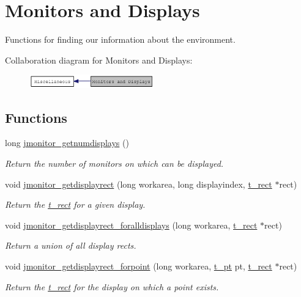 \hypertarget{group__jmonitor}{
\section{Monitors and Displays}
\label{group__jmonitor}
}


Functions for finding our information about the environment.  


Collaboration diagram for Monitors and Displays:\nopagebreak
\begin{figure}[H]
\begin{center}
\leavevmode
\includegraphics[width=153pt]{group__jmonitor}
\end{center}
\end{figure}
\subsection*{Functions}
\begin{DoxyCompactItemize}
\item 
long \hyperlink{group__jmonitor_ga2bd6c2e27e9ac7bfdd05cbf815ef1082}{jmonitor\_\-getnumdisplays} ()
\begin{DoxyCompactList}\small\item\em Return the number of monitors on which can be displayed. \item\end{DoxyCompactList}\item 
void \hyperlink{group__jmonitor_gac11ee33880f15ef641236e864978d9af}{jmonitor\_\-getdisplayrect} (long workarea, long displayindex, \hyperlink{structt__rect}{t\_\-rect} $\ast$rect)
\begin{DoxyCompactList}\small\item\em Return the \hyperlink{structt__rect}{t\_\-rect} for a given display. \item\end{DoxyCompactList}\item 
void \hyperlink{group__jmonitor_ga0ed7c2c443ef010c4584096967f3b00f}{jmonitor\_\-getdisplayrect\_\-foralldisplays} (long workarea, \hyperlink{structt__rect}{t\_\-rect} $\ast$rect)
\begin{DoxyCompactList}\small\item\em Return a union of all display rects. \item\end{DoxyCompactList}\item 
void \hyperlink{group__jmonitor_ga354f8b2efda018ec3ff2a609205a74a0}{jmonitor\_\-getdisplayrect\_\-forpoint} (long workarea, \hyperlink{structt__pt}{t\_\-pt} pt, \hyperlink{structt__rect}{t\_\-rect} $\ast$rect)
\begin{DoxyCompactList}\small\item\em Return the \hyperlink{structt__rect}{t\_\-rect} for the display on which a point exists. \item\end{DoxyCompactList}\end{DoxyCompactItemize}



